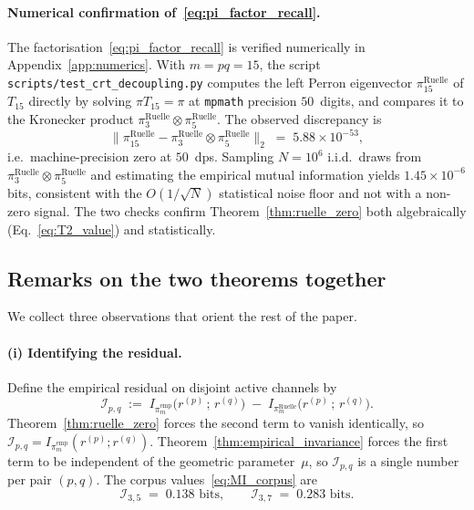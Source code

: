 \paragraph{Numerical confirmation of~\eqref{eq:pi_factor_recall}.}
The factorisation~\eqref{eq:pi_factor_recall} is verified numerically
in Appendix~\ref{app:numerics}. With $m = pq = 15$, the script
\texttt{scripts/test\_crt\_decoupling.py} computes the left Perron
eigenvector $\pi_{15}^{\mathrm{Ruelle}}$ of $T_{15}$ directly by
solving $\pi T_{15} = \pi$ at \texttt{mpmath} precision
$50$~digits, and compares it to the Kronecker product
$\pi_3^{\mathrm{Ruelle}} \otimes \pi_5^{\mathrm{Ruelle}}$. The
observed discrepancy is
\begin{equation}
  \bigl\| \pi_{15}^{\mathrm{Ruelle}}
        - \pi_3^{\mathrm{Ruelle}} \otimes \pi_5^{\mathrm{Ruelle}}
  \bigr\|_2
  \;=\; 5.88 \times 10^{-53},
  \label{eq:T2_value}
\end{equation}
i.e.\ machine-precision zero at $50$~dps. Sampling
$N = 10^6$ i.i.d.~draws from
$\pi_3^{\mathrm{Ruelle}} \otimes \pi_5^{\mathrm{Ruelle}}$ and
estimating the empirical mutual information yields
$1.45 \times 10^{-6}$ bits, consistent with the
$O(1/\sqrt{N})$ statistical noise floor and not with a non-zero
signal. The two checks confirm Theorem~\ref{thm:ruelle_zero} both
algebraically (Eq.~\eqref{eq:T2_value}) and statistically.

\subsection{Remarks on the two theorems together}
\label{ssec:both_thms}

We collect three observations that orient the rest of the paper.

\paragraph{(i) Identifying the residual.}
Define the empirical residual on disjoint active channels by
\begin{equation}
  \mathcal{I}_{p,q}
  \;:=\;
  I_{\pi_m^{\mathrm{emp}}}\bigl(r^{(p)}\,;\, r^{(q)}\bigr)
  \;-\;
  I_{\pi_m^{\mathrm{Ruelle}}}\bigl(r^{(p)}\,;\, r^{(q)}\bigr).
  \label{eq:residual_def}
\end{equation}
Theorem~\ref{thm:ruelle_zero} forces the second term to vanish
identically, so $\mathcal{I}_{p,q} =
I_{\pi_m^{\mathrm{emp}}}(r^{(p)}; r^{(q)})$.
Theorem~\ref{thm:empirical_invariance} forces the first term to be
independent of the geometric parameter~$\mu$, so $\mathcal{I}_{p,q}$
is a single number per pair $(p, q)$. The corpus
values~\eqref{eq:MI_corpus} are
\begin{equation}
  \mathcal{I}_{3,5} \;=\; 0.138 \text{ bits},
  \qquad
  \mathcal{I}_{3,7} \;=\; 0.283 \text{ bits}.
  \label{eq:residual_values}
\end{equation}

